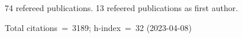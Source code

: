 74 refereed publications. 13 refeered publications as first author.

Total citations~=~3189; h-index~=~32 (2023-04-08)